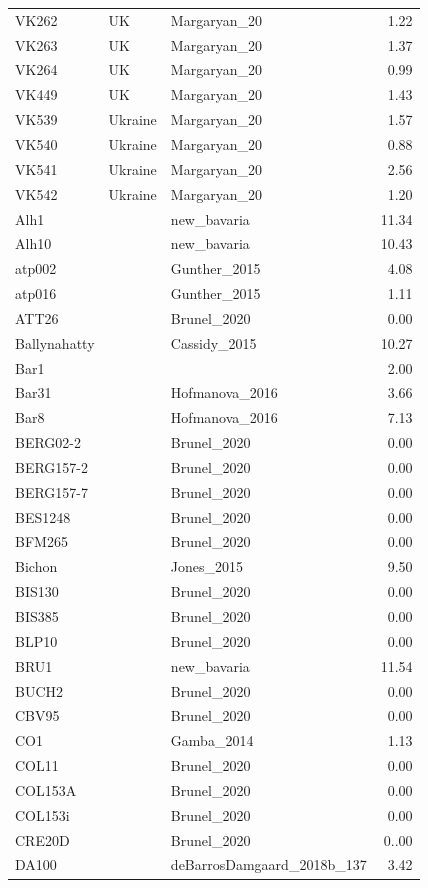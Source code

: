 \begin{longtable}[t]{lllr}
VK262 & UK & Margaryan\_20 & 1.22\\
VK263 & UK & Margaryan\_20 & 1.37\\
VK264 & UK & Margaryan\_20 & 0.99\\
VK449 & UK & Margaryan\_20 & 1.43\\
VK539 & Ukraine & Margaryan\_20 & 1.57\\
VK540 & Ukraine & Margaryan\_20 & 0.88\\
VK541 & Ukraine & Margaryan\_20 & 2.56\\
VK542 & Ukraine & Margaryan\_20 & 1.20\\
Alh1 &  & new\_bavaria & 11.34\\
Alh10 &  & new\_bavaria & 10.43\\
atp002 &  & Gunther\_2015 & 4.08\\
atp016 &  & Gunther\_2015 & 1.11\\
ATT26 &  & Brunel\_2020 & 0.00\\
Ballynahatty &  & Cassidy\_2015 & 10.27\\
Bar1 &  &  & 2.00\\
Bar31 &  & Hofmanova\_2016 & 3.66\\
Bar8 &  & Hofmanova\_2016 & 7.13\\
BERG02-2 &  & Brunel\_2020 & 0.00\\
BERG157-2 &  & Brunel\_2020 & 0.00\\
BERG157-7 &  & Brunel\_2020 & 0.00\\
BES1248 &  & Brunel\_2020 & 0.00\\
BFM265 &  & Brunel\_2020 & 0.00\\
Bichon &  & Jones\_2015 & 9.50\\
BIS130 &  & Brunel\_2020 & 0.00\\
BIS385 &  & Brunel\_2020 & 0.00\\
BLP10 &  & Brunel\_2020 & 0.00\\
BRU1 &  & new\_bavaria & 11.54\\
BUCH2 &  & Brunel\_2020 & 0.00\\
CBV95 &  & Brunel\_2020 & 0.00\\
CO1 &  & Gamba\_2014 & 1.13\\
COL11 &  & Brunel\_2020 & 0.00\\
COL153A &  & Brunel\_2020 & 0.00\\
COL153i &  & Brunel\_2020 & 0.00\\
CRE20D &  & Brunel\_2020 & 0..00\\
DA100 &  & deBarrosDamgaard\_2018b\_137 & 3.42\\

\end{longtable}
